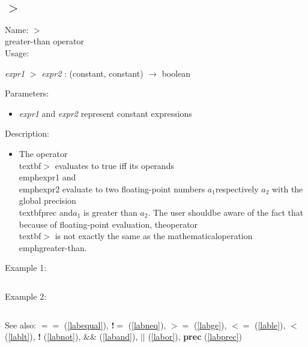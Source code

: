 \subsection{$>$}
\label{labgt}
\noindent Name: \textbf{$>$}\\
greater-than operator\\
\noindent Usage: 
\begin{center}
\emph{expr1} \textbf{$>$} \emph{expr2} : (\textsf{constant}, \textsf{constant}) $\rightarrow$ \textsf{boolean}\\
\end{center}
Parameters: 
\begin{itemize}
\item \emph{expr1} and \emph{expr2} represent constant expressions
\end{itemize}
\noindent Description: \begin{itemize}

\item The operator \\textbf{$>$} evaluates to true iff its operands \\emph{expr1} and\n   \\emph{expr2} evaluate to two floating-point numbers $a_1$\n   respectively $a_2$ with the global precision \\textbf{prec} and\n   $a_1$ is greater than $a_2$. The user should\n   be aware of the fact that because of floating-point evaluation, the\n   operator \\textbf{$>$} is not exactly the same as the mathematical\n   operation \\emph{greater-than}.\n\end{itemize}
\noindent Example 1: 
\begin{center}\begin{minipage}{15cm}\begin{Verbatim}[frame=single]
\end{Verbatim}
\end{minipage}\end{center}
\noindent Example 2: 
\begin{center}\begin{minipage}{15cm}\begin{Verbatim}[frame=single]
\end{Verbatim}
\end{minipage}\end{center}
See also: \textbf{$==$} (\ref{labequal}), \textbf{!$=$} (\ref{labneq}), \textbf{$>=$} (\ref{labge}), \textbf{$<=$} (\ref{lable}), \textbf{$<$} (\ref{lablt}), \textbf{!} (\ref{labnot}), \textbf{$\&\&$} (\ref{laband}), \textbf{$||$} (\ref{labor}), \textbf{prec} (\ref{labprec})
